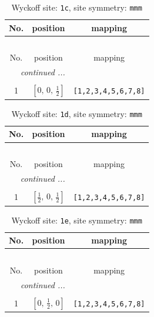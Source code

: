 \documentclass[fleqn,8pt]{jsarticle}
\begin{document}
\begin{longtable}{ccc}
\caption{Wyckoff site: {\tt 1c}, site symmetry: {\tt mmm}}
 \\
 \hline \hline
No. & position & mapping \\ \hline \endfirsthead

\multicolumn{2}{l}{\tablename\ \thetable{}} \\
 \hline \hline
No. & position & mapping \\ \hline \endhead

 \hline \hline
\multicolumn{2}{r}{\footnotesize\it continued ...} \\ \endfoot

 \hline \hline
\multicolumn{2}{r}{} \\ \endlastfoot

1 & $\left[ 0,\, 0,\, \frac{1}{2} \right]$ & {\tt [1,2,3,4,5,6,7,8]} \\
\end{longtable}
\renewcommand{\arraystretch}{1.2}
\begin{longtable}{ccc}
\caption{Wyckoff site: {\tt 1d}, site symmetry: {\tt mmm}}
 \\
 \hline \hline
No. & position & mapping \\ \hline \endfirsthead

\multicolumn{2}{l}{\tablename\ \thetable{}} \\
 \hline \hline
No. & position & mapping \\ \hline \endhead

 \hline \hline
\multicolumn{2}{r}{\footnotesize\it continued ...} \\ \endfoot

 \hline \hline
\multicolumn{2}{r}{} \\ \endlastfoot

1 & $\left[ \frac{1}{2},\, 0,\, \frac{1}{2} \right]$ & {\tt [1,2,3,4,5,6,7,8]} \\
\end{longtable}
\renewcommand{\arraystretch}{1.2}
\begin{longtable}{ccc}
\caption{Wyckoff site: {\tt 1e}, site symmetry: {\tt mmm}}
 \\
 \hline \hline
No. & position & mapping \\ \hline \endfirsthead

\multicolumn{2}{l}{\tablename\ \thetable{}} \\
 \hline \hline
No. & position & mapping \\ \hline \endhead

 \hline \hline
\multicolumn{2}{r}{\footnotesize\it continued ...} \\ \endfoot

 \hline \hline
\multicolumn{2}{r}{} \\ \endlastfoot

1 & $\left[ 0,\, \frac{1}{2},\, 0 \right]$ & {\tt [1,2,3,4,5,6,7,8]} \\
\end{longtable}
\end{document}
